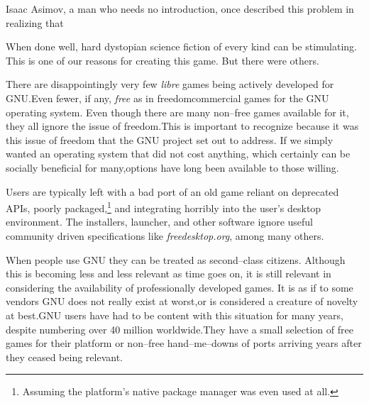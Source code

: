 Isaac Asimov, a man who needs no introduction, once described this problem in realizing that \footnotecite[extras={, p.~73.}][asimov1981]

When done well, hard dystopian science fiction of every kind can be stimulating. This is one of our reasons for creating this game. But there were others.

There are disappointingly very few {\it libre} games being actively developed for GNU. Even fewer, if any, {\it free} as in freedom commercial games for the GNU operating system. Even though there are many non--free games available for it, they all ignore the issue of freedom. This is important to recognize because it was this issue of freedom that the GNU project set out to address. If we simply wanted an operating system that did not cost anything, which certainly can be socially beneficial for many, options have long been available to those willing.\footnotecite[piratebay]

Users are typically left with a bad port of an old game reliant on deprecated APIs, poorly packaged,\footnote{Assuming the platform's native package manager was even used at all.} and integrating horribly into the user's desktop environment. The installers, launcher, and other software ignore useful community driven specifications like {\it freedesktop.org}, among many others.

When people use GNU they can be treated as second--class citizens. Although this is becoming less and less relevant as time goes on, it is still relevant in considering the availability of professionally developed games. It is as if to some vendors GNU does not really exist at worst, or is considered a creature of novelty at best. GNU users have had to be content with this situation for many years, despite numbering over 40 million worldwide. They have a small selection of free games for their platform or non--free hand--me--downs of ports arriving years after they ceased being relevant.


